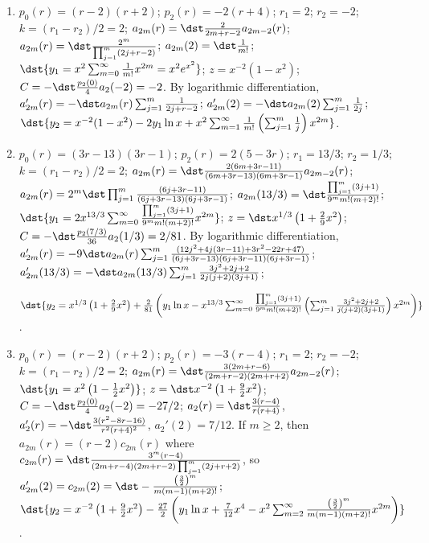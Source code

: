 \documentclass[openany]{book}
\newenvironment{sectionSolutions}{
 \begin{enumerate}[item-label={\thesection.\arabic{enumi}.}]
}{
 \end{enumerate}
}
\begin{document}
\begin{sectionSolutions}
$\dst{y_2=x^{-5/2}+\frac{1}{4}y_1\ln x
-x^{-1/2}\sum_{m=1}^\infty\frac{(-1)^m\prod_{j=1}^m(2j-1)}{8^{m+1}m!(m+1)!}
\left(\sum_{j=1}^m\frac{2j^2-2j-1}{ j(j+1)(2j-1)}\right) x^{2m}}$.


\item
$p_0(r)=(r-2)(r+2)$;
$p_2(r)=-2(r+4)$;
$r_1=2$; $r_2=-2$; $k=(r_1-r_2)/2=2$;
$a_{2m}(r)=\dst\frac{2}{2m+r-2}a_{2m-2}(r)$;
 $a_{2m}(r)=\dst\frac{2^m}{\prod_{j=1}^m(2j+r-2)}$;
$a_{2m}(2)=\dst\frac{1}{ m!}$;
$\dst{y_1=x^2\sum_{m=0}^\infty\frac{1}{ m!}x^{2m}=x^2e^{x^2}}$;
$z=x^{-2}(1-x^2)$;
$C=-\dst\frac{p_2(0)}{4}a_2(-2)=-2$.
By logarithmic differentiation,
$a_{2m}'(r)=-\dst a_{2m}(r)\sum_{j=1}^m\frac{1}{2j+r-2} $;
$a_{2m}'(2)=-\dst a_{2m}(2)\sum_{j=1}^m\frac{1}{2j}$;
$\dst{y_2=x^{-2}(1-x^2)-2y_1\ln x+x^2\sum_{m=1}^\infty\frac{1}{
m!}\left(\sum_{j=1}^m\frac{1}{ j}\right)x^{2m}}$.


\item
$p_0(r)=(3r-13)(3r-1)$;
$p_2(r)=2(5-3r)$;
$r_1=13/3$; $r_2=1/3$; $k=(r_1-r_2)/2=2$;
$a_{2m}(r)=\dst\frac{2(6m+3r-11)}{(6m+3r-13)(6m+3r-1)}a_{2m-2}(r)$;
$a_{2m}(r)=2^m\dst\prod_{j=1}^m\frac{(6j+3r-11)}{(6j+3r-13)(6j+3r-1)}$;
$a_{2m}(13/3)=\dst\frac{\prod_{j=1}^m(3j+1) }{9^mm!(m+2)!}$;
$\dst{y_1=2x^{13/3}\sum_{m=0}^\infty\frac{\prod_{j=1}^m(3j+1)
}{9^mm!(m+2)!}x^{2m}}$;
$z=\dst x^{1/3}\left(1+\frac{2}{9}x^2\right)$;
$C=-\dst\frac{p_2(7/3)}{36}a_2(1/3)=2/81$.
By logarithmic differentiation,
$a_{2m}'(r)=-9\dst a_{2m}(r)\sum_{j=1}^m
\frac{(12j^2+4j(3r-11)+3r^2-22r+47)}{(6j+3r-13)(6j+3r-11)(6j+3r-1)}$;
$a_{2m}'(13/3)=-\dst
a_{2m}(13/3)\sum_{j=1}^m\frac{3j^2+2j+2}{2j(j+2)(3j+1)}$;

$\dst{y_2=x^{1/3}\left(1+\frac{2}{9}x^2\right)+\frac{2}{81}\left(
y_1\ln
x-x^{13/3}\sum_{m=0}^\infty\frac{\prod_{j=1}^m(3j+1)}{9^mm!(m+2)!}
\left(\sum_{j=1}^m\frac{3j^2+2j+2}{ j(j+2)(3j+1)}\right)x^{2m}\right)}$.


\item
$p_0(r)=(r-2)(r+2)$;
$p_2(r)=-3(r-4)$;
$r_1=2$; $r_2=-2$; $k=(r_1-r_2)/2=2$;
$a_{2m}(r)=\dst\frac{3(2m+r-6)}{(2m+r-2)(2m+r+2)}
a_{2m-2}(r)$;
$\dst{y_1=x^2\left(1-\frac{1}{2}x^2\right)}$;
$z=\dst x^{-2}\left(1+\frac{9}{2}x^2\right)$;
$C=-\dst\frac{p_2(0)}{4}a_2(-2)=-27/2$;
$a_2(r)=\dst\frac{3(r-4)}{ r(r+4)}$,
$a_2'(r)=-\dst\frac{3(r^2-8r-16)}{ r^2(r+4)^2}$,
$a_2'(2)=7/12$. If $m\ge2$, then $a_{2m}(r)=(r-2)c_{2m}(r)$ where
$c_{2m}(r)=\dst\frac{3^m(r-4)}{(2m+r-4)(2m+r-2)\prod_{j=1}^m(2j+r+2)}$,
so $a_{2m}'(2)=c_{2m}(2)=\dst -\frac{\left(\frac{3}{2}\right)^m }{
m(m-1)(m+2)!}$;
$\dst{y_2=x^{-2}\left(1+\frac{9}{2}x^2\right)-\frac{27}{2}\left(
y_1\ln x+\frac{7}{12}x^4-x^2\sum_{m=2}^\infty\frac{\left(\frac{3}{2}\right)^m
}{ m(m-1)(m+2)!}x^{2m}\right)}$.




\end{sectionSolutions}
\end{document}
